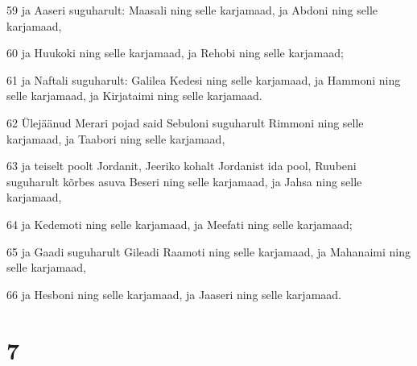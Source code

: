 \par 59 ja Aaseri suguharult: Maasali ning selle karjamaad, ja Abdoni ning selle karjamaad,
\par 60 ja Huukoki ning selle karjamaad, ja Rehobi ning selle karjamaad;
\par 61 ja Naftali suguharult: Galilea Kedesi ning selle karjamaad, ja Hammoni ning selle karjamaad, ja Kirjataimi ning selle karjamaad.
\par 62 Ülejäänud Merari pojad said Sebuloni suguharult Rimmoni ning selle karjamaad, ja Taabori ning selle karjamaad,
\par 63 ja teiselt poolt Jordanit, Jeeriko kohalt Jordanist ida pool, Ruubeni suguharult kõrbes asuva Beseri ning selle karjamaad, ja Jahsa ning selle karjamaad,
\par 64 ja Kedemoti ning selle karjamaad, ja Meefati ning selle karjamaad;
\par 65 ja Gaadi suguharult Gileadi Raamoti ning selle karjamaad, ja Mahanaimi ning selle karjamaad,
\par 66 ja Hesboni ning selle karjamaad, ja Jaaseri ning selle karjamaad.

\chapter{7}

